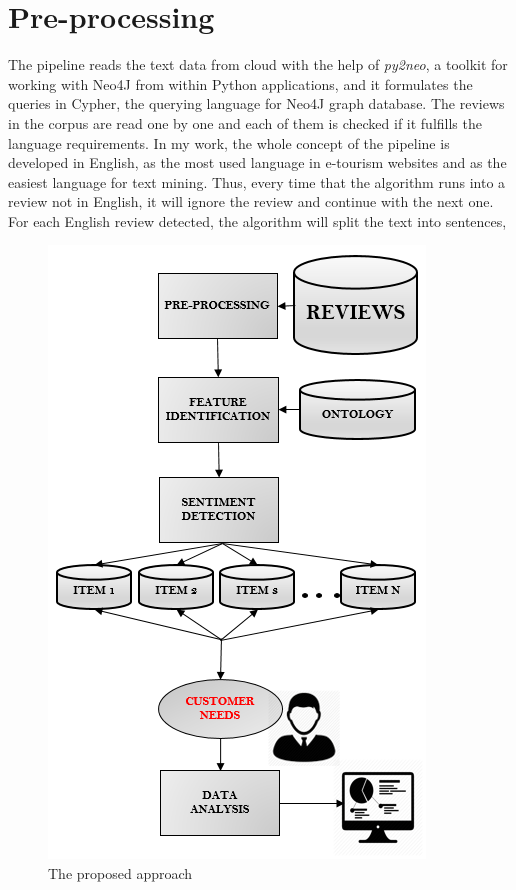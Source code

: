 \section{Pre-processing}
The pipeline reads the text data from cloud with the help of \textit{py2neo}, a toolkit for working with Neo4J from within Python applications, and it formulates the queries in Cypher, the querying language for Neo4J graph database. The reviews in the corpus are read one by one and each of them is checked if it fulfills the language requirements. In my work, the whole concept of the pipeline is developed in English, as the most used language in e-tourism websites and as the easiest language for text mining. Thus, every time that the algorithm runs into a review not in English, it will ignore the review and continue with the next one. For each English review detected, the algorithm will split the text into sentences, 
\begin{figure}[h!]
	\centering
	\includegraphics[height=0.72\textheight]{Pipeline1}
	\caption{The proposed approach}
	\label{fig:pipe}
\end{figure} 
